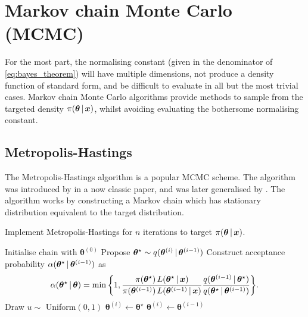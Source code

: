 \section{Markov chain Monte Carlo (MCMC)}
\label{sec:mcmc}

For the most part, the normalising constant (given in the denominator of
\cref{eq:bayes_theorem}) will have multiple dimensions, not produce a density function of
standard form, and be difficult to evaluate in all but the most trivial cases. Markov
chain Monte Carlo algorithms provide methods to sample from the targeted density
$\pi(\bm{\theta} \,|\, \bm{x})$, whilst avoiding evaluating the bothersome normalising
constant.

\subsection{Metropolis-Hastings}
\label{ssec:metropolis_hastings}

The Metropolis-Hastings algorithm is a popular MCMC scheme. The algorithm was introduced
by \textcite{metropolis53} in a now classic paper, and was later generalised by
\textcite{hastings70}. The algorithm works by constructing a Markov chain which has
stationary distribution equivalent to the target distribution.

\begin{algorithm}
  \caption{Implement Metropolis-Hastings for $n$ iterations to target $\pi(\bm{\theta} \,|\, \bm{x})$.}
  \label{alg:metropolis_hastings}
  \begin{algorithmic}[1]
    \State Initialise chain with $\bm{\theta}^{(0)}$
      \State Propose ${\bm{\theta}}^\star \sim q(\bm{\theta}^{(i)} \,|\, \bm{\theta}^{(i-1)})$
      \State Construct acceptance probability $\alpha(\bm{\theta}^\star \,|\, \bm{\theta}^{(i-1)})$ as
      \begin{equation*}
        \alpha(\bm{\theta}^\star \given \bm{\theta}) =
        \min\bigg\{1,
        \frac{\pi(\bm{\theta}^\star) \, L(\bm{\theta}^\star \given \bm{x})}%
        {\pi(\bm{\theta}^{(i-1)}) \, L(\bm{\theta}^{(i-1)} \given \bm{x})}
        \frac{q(\bm{\theta}^{(i-1)} \given \bm{\theta}^\star)}%
        {q(\bm{\theta}^\star \given \bm{\theta}^{(i-1)})}
        \bigg\}.
      \end{equation*}
      \State Draw $u \sim$ Uniform$(0, 1)$
        \State {}
        \State $\bm{\theta}^{(i)} \leftarrow \bm{\theta}^\star$
      \Else
        \State {}
        \State $\bm{\theta}^{(i)} \leftarrow \bm{\theta}^{(i-1)}$
      \EndIf
    \EndFor
  \end{algorithmic}
\end{algorithm}

